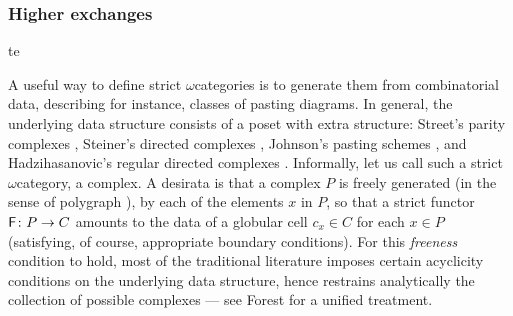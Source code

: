 \subsubsection*{Higher exchanges}te

A useful way to define strict \( \omega \)\nbd categories is to generate them from combinatorial data, describing for instance, classes of pasting diagrams.
In general, the underlying data structure consists of a poset with extra structure: Street's parity complexes \cite{street1991parity}, Steiner's directed complexes \cite{steiner1993algebra}, Johnson's pasting schemes \cite{johnson1989pasting}, and Hadzihasanovic's regular directed complexes \cite{hadzihasanovic2024combinatorics}.
Informally, let us call such a strict \( \omega \)\nbd category, a complex. 
A desirata is that a complex \( P \) is freely generated (in the sense of polygraph \cite{burroni1993higher}), by each of the elements \( x \) in \( P \), so that a strict functor \( \mathsf{F} \colon P \to C \) amounts to the data of a globular cell \( c_x \in C \) for each \( x \in P \) (satisfying, of course, appropriate boundary conditions).
For this \emph{freeness} condition to hold, most of the traditional literature imposes certain acyclicity conditions on the underlying data structure, hence restrains analytically the collection of possible complexes --- see Forest \cite{forest2022pasting} for a unified treatment.

